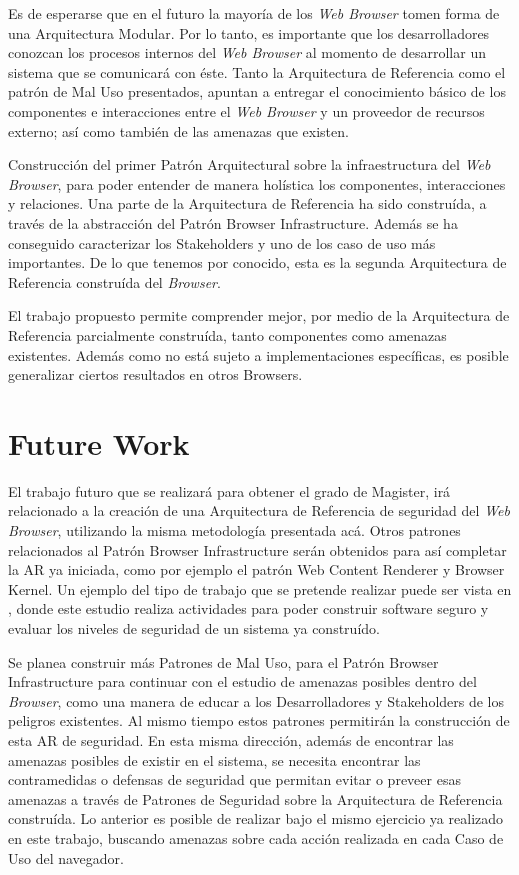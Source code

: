 \documentclass{sig-alternate-05-2015}
\begin{document}
Es de esperarse que en el futuro la mayoría de los \textit{Web Browser} tomen forma de una Arquitectura Modular. Por lo tanto, es importante que los desarrolladores conozcan los procesos internos del \textit{Web Browser} al momento de desarrollar un sistema que se comunicará con éste. Tanto la Arquitectura de Referencia como el patrón de Mal Uso presentados, apuntan a entregar el conocimiento básico de los componentes e interacciones entre el \textit{Web Browser} y un proveedor de recursos externo; así como también de las amenazas que existen.

Construcción del primer Patrón Arquitectural sobre la infraestructura del \textit{Web Browser}, para poder entender de manera holística los componentes, interacciones y relaciones. Una parte de la Arquitectura de Referencia ha sido construída, a través de la abstracción del Patrón Browser Infrastructure. Además se ha conseguido caracterizar los Stakeholders y uno de los caso de uso más importantes. De lo que tenemos por conocido, esta es la segunda Arquitectura de Referencia construída del \textit{Browser}. 

El trabajo propuesto permite comprender mejor, por medio de la Arquitectura de Referencia parcialmente construída, tanto componentes como amenazas existentes. Además como no está sujeto a implementaciones específicas, es posible generalizar ciertos resultados en otros Browsers.


\section*{Future Work}
El trabajo futuro que se realizará para obtener el grado de Magister, irá relacionado a la creación de una Arquitectura de Referencia de seguridad del \textit{Web Browser}, utilizando la misma metodología presentada acá. Otros patrones relacionados al Patrón Browser Infrastructure serán obtenidos para así completar la AR ya iniciada, como por ejemplo el patrón Web Content Renderer y Browser Kernel. Un ejemplo del tipo de trabajo que se pretende realizar puede ser vista en \cite{fernandez2014security}, donde este estudio realiza actividades para poder construir software seguro y evaluar los niveles de seguridad de un sistema ya construído.

Se planea construir más Patrones de Mal Uso, para el Patrón Browser Infrastructure para continuar con el estudio de amenazas posibles dentro del \textit{Browser}, como una manera de educar a los Desarrolladores y Stakeholders de los peligros existentes. Al mismo tiempo estos patrones permitirán la construcción de esta AR de seguridad. En esta misma dirección, además de encontrar las amenazas posibles de existir en el sistema, se necesita encontrar las contramedidas o defensas de seguridad que permitan evitar o preveer esas amenazas a través de Patrones de Seguridad sobre la Arquitectura de Referencia construída. Lo anterior es posible de realizar bajo el mismo ejercicio ya realizado en este trabajo, buscando amenazas sobre cada acción realizada en cada Caso de Uso del navegador.
\end{document}
